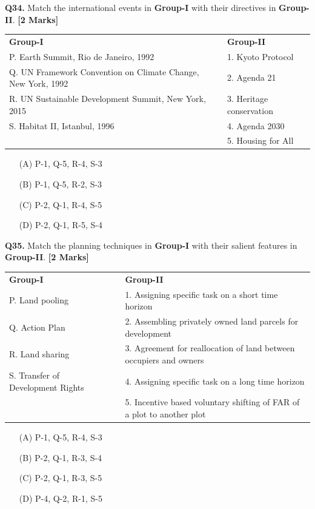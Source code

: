 \documentclass[11pt]{article}
\newcommand{\questionb}[2]{
    \noindent\textbf{Q#2.} #1 \hfill \textbf{[2 Marks]}
}
\begin{document}
\vspace{0.5cm}

\questionb{Match the international events in \textbf{Group-I} with their directives in \textbf{Group-II}.}{34}

\begin{tabularx}{\linewidth}{lXl}
\textbf{Group-I} & & \textbf{Group-II} \\
P. Earth Summit, Rio de Janeiro, 1992 & & 1. Kyoto Protocol \\
Q. UN Framework Convention on Climate Change, New York, 1992 & & 2. Agenda 21 \\
R. UN Sustainable Development Summit, New York, 2015 & & 3. Heritage conservation \\
S. Habitat II, Istanbul, 1996 & & 4. Agenda 2030 \\
& & 5. Housing for All \\
\end{tabularx}

\begin{enumerate}
    \item[(A)] P-1, Q-5, R-4, S-3
    \item[(B)] P-1, Q-5, R-2, S-3  
    \item[(C)] P-2, Q-1, R-4, S-5
    \item[(D)] P-2, Q-1, R-5, S-4
\end{enumerate}

\vspace{0.5cm}

\questionb{Match the planning techniques in \textbf{Group-I} with their salient features in \textbf{Group-II}.}{35}

\begin{tabularx}{\linewidth}{lXl}
\textbf{Group-I} & & \textbf{Group-II} \\
P. Land pooling & & 1. Assigning specific task on a short time horizon \\
Q. Action Plan & & 2. Assembling privately owned land parcels for development \\
R. Land sharing & & 3. Agreement for reallocation of land between occupiers and owners \\
S. Transfer of Development Rights & & 4. Assigning specific task on a long time horizon \\
& & 5. Incentive based voluntary shifting of FAR of a plot to another plot \\
\end{tabularx}

\begin{enumerate}
    \item[(A)] P-1, Q-5, R-4, S-3
    \item[(B)] P-2, Q-1, R-3, S-4  
    \item[(C)] P-2, Q-1, R-3, S-5
    \item[(D)] P-4, Q-2, R-1, S-5
\end{enumerate}
\end{document}
